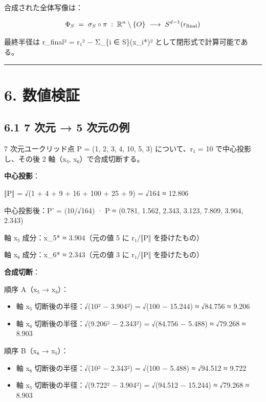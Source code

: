 \documentclass[a4paper,11pt]{ltjsarticle}
\theoremstyle{definition}
\theoremstyle{remark}
\providecommand{\tightlist}{%
  \setlength{\itemsep}{0pt}\setlength{\parskip}{0pt}}
\begin{document}
合成された全体写像は：

\[
\Phi_{S} \;=\; \sigma_S \circ \pi \;:\; \mathbb{R}^{n} \setminus \{O\} \;\longrightarrow\; S^{d-1}(r_{\rm final})
\]

最終半径は r\_final² = r₁² − Σ\_\{i ∈ S\}(x\_i*)²
として閉形式で計算可能である。

\begin{center}\rule{0.5\linewidth}{0.5pt}\end{center}

\section{6. 数値検証}\label{ux6570ux5024ux691cux8a3c}

\subsection{6.1 7 次元 → 5
次元の例}\label{ux6b21ux5143-5-ux6b21ux5143ux306eux4f8b}

7 次元ユークリッド点 P = (1, 2, 3, 4, 10, 5, 3) について、r₁ = 10
で中心投影し、その後 2 軸（x₅, x₆）で合成切断する。

\textbf{中心投影}：

‖P‖ = √(1 + 4 + 9 + 16 + 100 + 25 + 9) = √164 ≈ 12.806

中心投影後：P' = (10/√164) · P ≈ (0.781, 1.562, 2.343, 3.123, 7.809,
3.904, 2.343)

軸 x₅ 成分：x\_5* ≈ 3.904（元の値 5 に r₁/‖P‖ を掛けたもの）

軸 x₆ 成分：x\_6* ≈ 2.343（元の値 3 に r₁/‖P‖ を掛けたもの）

\textbf{合成切断}：

順序 A（x₅ → x₆）：

\begin{itemize}
\tightlist
\item
  軸 x₅ 切断後の半径：√(10² − 3.904²) = √(100 − 15.244) ≈ √84.756 ≈
  9.206
\item
  軸 x₆ 切断後の半径：√(9.206² − 2.343²) = √(84.756 − 5.488) ≈ √79.268 ≈
  8.903
\end{itemize}

順序 B（x₆ → x₅）：

\begin{itemize}
\tightlist
\item
  軸 x₆ 切断後の半径：√(10² − 2.343²) = √(100 − 5.488) ≈ √94.512 ≈ 9.722
\item
  軸 x₅ 切断後の半径：√(9.722² − 3.904²) = √(94.512 − 15.244) ≈ √79.268
  ≈ 8.903
\end{itemize}
\end{document}
